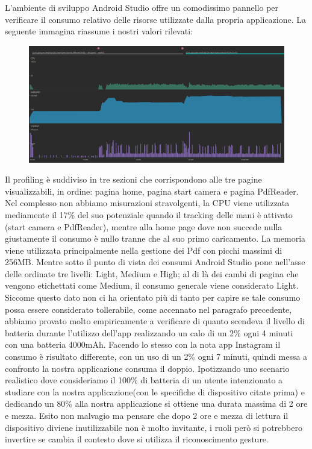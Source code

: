 L’ambiente di sviluppo Android Studio offre un comodissimo pannello per verificare il consumo relativo delle risorse utilizzate dalla propria applicazione. La seguente immagina riassume i nostri valori rilevati:

\begin{figure}
\includegraphics[width=\textwidth]{images/profiling_app.png}
\end{figure}

Il profiling è suddiviso in tre sezioni che corrispondono alle tre pagine visualizzabili, in ordine: pagina home, pagina start camera e pagina PdfReader. Nel complesso non abbiamo misurazioni stravolgenti, la CPU viene utilizzata mediamente il 17\% del suo potenziale quando il tracking delle mani è attivato (start camera e PdfReader), mentre alla home page dove non succede nulla giustamente il consumo è nullo tranne che al suo primo caricamento. La memoria viene utilizzata principalmente nella gestione dei Pdf con picchi massimi di 256MB. Mentre sotto il punto di vista dei consumi Android Studio pone nell’asse delle ordinate tre livelli: Light, Medium e High; al di là dei cambi di pagina che vengono etichettati come Medium, il consumo generale viene considerato Light. Siccome questo dato non ci ha orientato più di tanto per capire se tale consumo possa essere considerato tollerabile, come accennato nel paragrafo precedente, abbiamo provato molto empiricamente a verificare di quanto scendeva il livello di batteria durante l’utilizzo dell’app realizzando un calo di un 2\% ogni 4 minuti con una batteria 4000mAh. Facendo lo stesso con la nota app Instagram il consumo è risultato differente, con un uso di un 2\% ogni 7 minuti, quindi messa a confronto la nostra applicazione consuma il doppio. Ipotizzando uno scenario realistico dove consideriamo il 100\% di batteria di un utente intenzionato a studiare con la nostra applicazione(con le specifiche di dispositivo citate prima)  e dedicando un 80\% alla nostra applicazione si ottiene una durata massima di 2 ore e mezza. Esito non malvagio ma pensare che dopo 2 ore e mezza di lettura il dispositivo diviene inutilizzabile non è molto invitante, i ruoli però si potrebbero invertire se cambia il contesto dove si utilizza il riconoscimento gesture.



